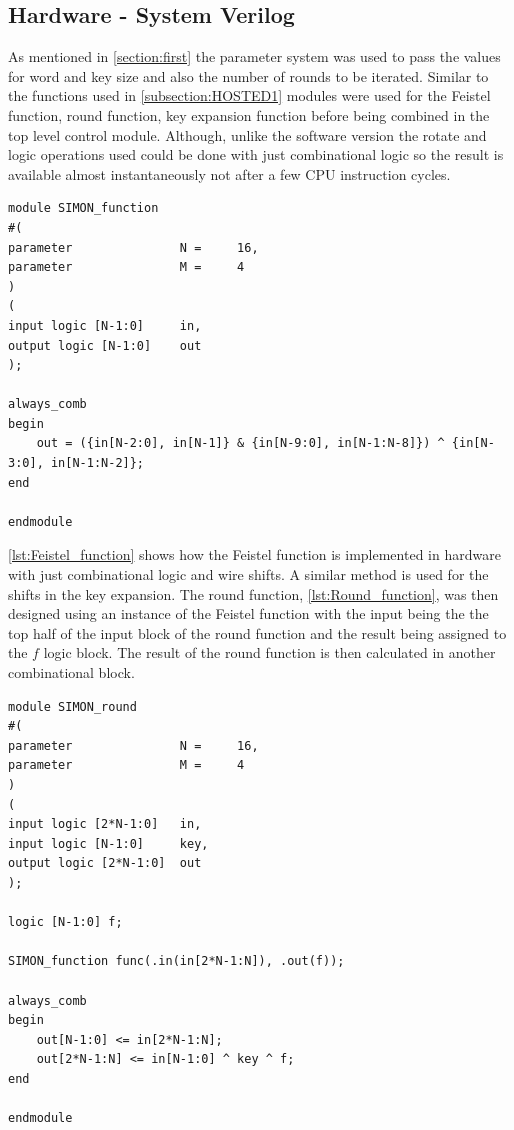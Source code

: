 \documentclass[12pt,twoside,a4paper]{report}
\begin{document}
	\subsection{Hardware - System Verilog}
	\label{subsection:SV1}
	As mentioned in \autoref{section:first} the parameter system was used to pass the values for word and key size and also the number of rounds to be iterated. Similar to the functions used in \autoref{subsection:HOSTED1} modules were used for the Feistel function, round function, key expansion function before being combined in the top level control module. Although, unlike the software version the rotate and logic operations used could be done with just combinational logic so the result is available almost instantaneously not after a few CPU instruction cycles. 

	\begin{minipage}{\linewidth}
	\begin{lstlisting}[label={lst:Feistel_function},caption={The feistel function},style=SVStyle]	
module SIMON_function
#(
parameter 				N = 	16,
parameter 				M =		4
)
(
input logic [N-1:0]		in,
output logic [N-1:0]	out
);

always_comb
begin
	out = ({in[N-2:0], in[N-1]} & {in[N-9:0], in[N-1:N-8]}) ^ {in[N-3:0], in[N-1:N-2]};
end

endmodule
	\end{lstlisting}
	\end{minipage}
	
	\autoref{lst:Feistel_function} shows how the Feistel function is implemented in hardware with just combinational logic and wire shifts.  A similar method is used for the shifts in the key expansion. The round function, \autoref{lst:Round_function}, was then designed using an instance of the Feistel function with the input being the the top half of the input block of the round function and the result being assigned to the $f$ logic block. The result of the round function is then calculated in another combinational block.

	\begin{minipage}{\linewidth}
	\begin{lstlisting}[label={lst:Round_function},caption={The Round function},style=SVStyle]	
module SIMON_round
#(
parameter 				N = 	16,
parameter 				M = 	4	
)
(
input logic [2*N-1:0] 	in,
input logic [N-1:0] 	key,	
output logic [2*N-1:0]	out
);

logic [N-1:0] f;

SIMON_function func(.in(in[2*N-1:N]), .out(f));

always_comb
begin
	out[N-1:0] <= in[2*N-1:N];
	out[2*N-1:N] <= in[N-1:0] ^ key ^ f;
end

endmodule
	\end{lstlisting}
	\end{minipage}
	
\end{document}
